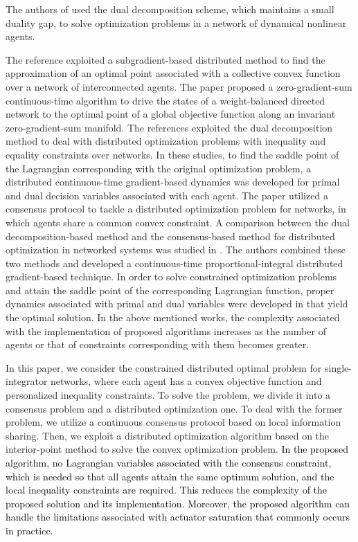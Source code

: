\documentclass[letterpaper, 10 pt, conference]{ieeeconf}  %
\newcommand{\crb}{\color{black}}
\newcommand{\crr}{\color{black}}
\begin{document}
The authors of \cite{raffard2004distributed} used {\crr the dual decomposition scheme, which maintains a small duality gap,} to solve optimization problems
in a network of dynamical nonlinear agents. { The reference \cite{nedic2009distributed}  exploited a {\crr subgradient-based} distributed method to find the approximation of an optimal point associated with a collective convex function over a network
	of interconnected agents. The paper \cite{lu2012zero} proposed
	a zero-gradient-sum continuous-time algorithm  to drive the states of a weight-balanced directed network to {\crr the optimal point of a} global objective function along an invariant zero-gradient-sum manifold. The references \cite{yuan2011distributed,yi2015distributed,kia2015distributed} exploited   { \crr the dual decomposition method} to deal with distributed optimization problems with inequality
	and equality constraints { \crr over networks.} In these studies, to find the saddle point of {\crr the Lagrangian corresponding with the original  optimization problem},
a distributed {\crr continuous-time gradient-based dynamics was developed for primal and dual
decision variables associated with each agent.}   The
paper \cite{qiu2016distributed} utilized  a consensus protocol  to tackle a distributed optimization problem for networks, { in which   agents   share a  common convex constraint. A comparison between the dual decomposition-based method and the consensus-based method
	for distributed optimization in networked systems  was studied in \cite{droge2014continuous}. {\crr The authors} combined these two methods and developed a continuous-time
	proportional-integral distributed gradient-based technique. In order to solve constrained optimization problems and attain  the saddle
	point of the corresponding Lagrangian function, proper dynamics associated with primal and dual variables were developed in \cite{feijer2010stability} that yield the optimal  solution. In the above mentioned works, the complexity associated with the implementation of proposed algorithms increases as the number of agents or that of constraints corresponding with them becomes greater.
}

In this paper, we consider the constrained distributed optimal problem for single-integrator networks, where each agent has a convex objective function and personalized  inequality constraints.
To solve the problem, we divide it into {\crr a consensus problem} and a
distributed optimization one. To deal with the former problem, we
utilize a continuous  consensus protocol based
on local information sharing. Then, we exploit a distributed optimization algorithm based on the interior-point method to solve
the convex optimization problem.\textcolor{black}{{} {\crb In the proposed
		algorithm, no Lagrangian variables associated with the consensus constraint, {\crr which is  needed so that all agents attain the same optimum solution},
		and  {\crr the} local inequality constraints are required.
		This reduces the complexity of the proposed solution and its implementation.  Moreover, the proposed algorithm can handle the limitations associated with actuator saturation  that commonly occurs in practice.  }}

}
\end{document}
